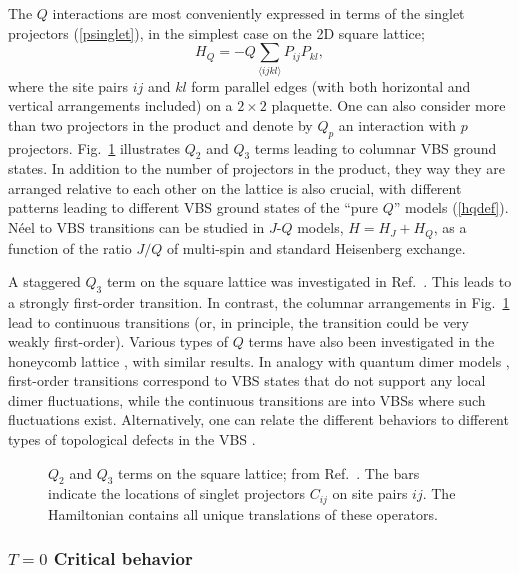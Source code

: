 \documentclass[range]{ar2e}
\begin{document}
The $Q$ interactions are most conveniently expressed in terms of the singlet projectors (\ref{psinglet}), in the simplest case on the 2D square lattice;
\begin{equation}
H_Q = - Q\sum_{\langle ijkl\rangle } P_{ij}P_{kl},
\label{hqdef}
\end{equation}
where the site pairs $ij$ and $kl$ form parallel edges (with both horizontal and vertical arrangements included) on a $2\times 2$ plaquette. 
One can also consider more than two projectors in the product and denote by $Q_p$ an interaction with $p$ projectors. Fig.~\ref{qterms} illustrates $Q_2$ 
and $Q_3$ terms leading to columnar VBS ground states. In addition to the number of projectors in the product, they way they are arranged relative to each 
other on the lattice is also crucial, with different patterns leading to different VBS ground states of the ``pure $Q$'' models (\ref{hqdef}). N\'eel to 
VBS transitions can be studied in $J$-$Q$ models, $H=H_J+H_Q$, as a function of the ratio $J/Q$ of multi-spin and standard Heisenberg exchange. 

A staggered $Q_3$ term on the square lattice was investigated in Ref.~\cite{Sen10}. This leads to a strongly first-order transition. In contrast, 
the columnar arrangements in Fig.~\ref{qterms} lead to continuous transitions (or, in principle, the transition could be very weakly first-order). 
Various types of $Q$ terms have also been investigated in the honeycomb lattice \cite{Banerjee11}, with similar results. In analogy with quantum 
dimer models \cite{Rokhsar88,Moessner01}, first-order transitions correspond to VBS states that do not support any local dimer fluctuations, while 
the continuous transitions are into VBSs where such fluctuations exist. Alternatively, one can relate the different behaviors to different types of 
topological defects in the VBS \cite{levin2004:vbs,Banerjee11}.

\begin{figure}
\centerline{}
\caption{$Q_2$ and $Q_3$ terms on the square lattice; from Ref.~\cite{Sandvik12}. The bars indicate the locations of singlet projectors 
$C_{ij}$ on site pairs $ij$. The Hamiltonian contains all unique translations of these operators.}
\label{qterms}
\end{figure}

\subsubsection{$T=0$ Critical behavior}
\end{document}
